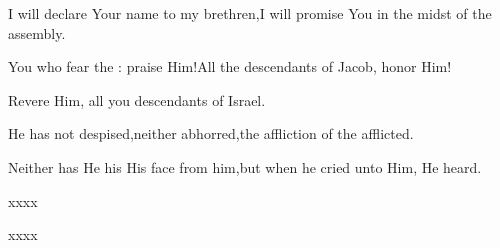 \begin{inparaenum}
  \pd {} I will declare Your name to my brethren,\pa I will promise You in the midst of the assembly.%
  
  \pc {} You who fear the \lord: praise Him!\pa All the descendants of Jacob, honor Him!%
  
  \pd Revere Him, all you descendants of Israel.%
  
  \pc {} He has not despised,\pa neither abhorred,\pa the affliction of the afflicted.%
  
  \pd Neither has He his His face from him,\pa but when he cried unto Him, He heard.%
  
  \pc {} %
  
  \pc {} %
  
  \pd %
  
  \pd {} %
  
  \pd %
  
  \pc {} \smallskip%
  
  \pa {} %
  
  \pa xxxx \pa {} %
  
  \pa xxxx \pa {} %
\end{inparaenum}
